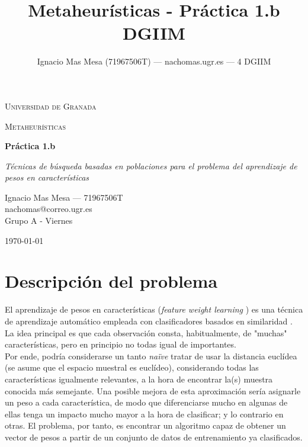 \documentclass[11pt]{article}
\theoremstyle{plain}
\theoremstyle{definition}
\begin{document}
\title{Metaheurísticas - Práctica 1.b \\
  DGIIM}

\date{}
\author{Ignacio Mas Mesa (71967506T) --- nachomas\@correo.ugr.es --- 4 DGIIM}

\begin{titlepage}
	\centering
	{\scshape\LARGE Universidad de Granada \par}
	\vspace{1cm}
	{\scshape\Large Metaheurísticas \par}
	\vspace{1.5cm}
	{\huge\bfseries Práctica 1.b \par}
	\vspace{1cm}
	{\Large\itshape Técnicas de búsqueda basadas en poblaciones para el problema
  del aprendizaje de pesos en características \par}
	\vfill
        Ignacio Mas Mesa --- 71967506T \\
        nachomas@correo.ugr.es \\
        Grupo A - Viernes
	\vfill

	{\large \today\par}
      \end{titlepage}

\tableofcontents

\section{Descripción del problema}

El aprendizaje de pesos en características (\textit{feature weight
  learning} \cite{svm}) es una técnica de aprendizaje automático empleada con
clasificadores basados en similaridad \cite{similarity}. La idea principal es que
cada observación consta, habitualmente, de "muchas" características,
pero en principio no todas igual de importantes. \\


Por ende, podría
considerarse un tanto \textit{naïve} tratar de usar la distancia
euclídea (se asume que el
espacio muestral es euclídeo), considerando todas las características
igualmente relevantes, a la hora de encontrar la(s) muestra conocida más
semejante. Una posible mejora de esta aproximación sería asignarle un
peso a cada característica, de modo que diferenciarse mucho en algunas
de ellas tenga un impacto mucho mayor a la hora de clasificar; y lo
contrario en otras. El problema, por tanto, es encontrar un algoritmo
capaz de obtener un vector de pesos a partir de un conjunto de datos
de entrenamiento ya clasificados. \\
\end{document}
